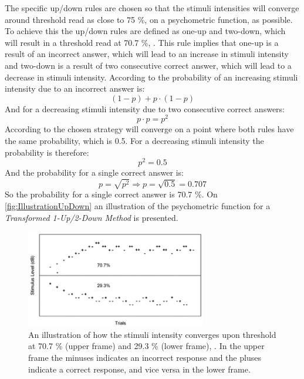The specific up/down rules are chosen so that the stimuli intensities will converge around threshold read as close to 75 \%, on a psychometric function, as possible. To achieve this the up/down rules are defined as one-up and two-down, which will result in a threshold read at 70.7 \%, \parencite[p. 22]{PDF:Psychoacoustic}. This rule implies that one-up is a result of an incorrect answer, which will lead to an increase in stimuli intensity and two-down is a result of two consecutive correct answer, which will lead to a decrease in stimuli intensity. According to \textcite[p. 293]{PDF:Hearing} the probability of an increasing stimuli intensity due to an incorrect answer is: 
%
\begin{equation}
	(1-p)+p\cdot(1-p)
\end{equation}  
%
And for a decreasing stimuli intensity due to two consecutive correct answers: 
%
\begin{equation}
	p\cdot p = p^2
\end{equation}    
%       
According to \textcite[p. 293]{PDF:Hearing} the chosen strategy will converge on a point where both rules have the same probability, which is 0.5. For a decreasing stimuli intensity the probability is therefore:
%
\begin{equation}
	p^2=0.5
\end{equation}  
%
And the probability for a single correct answer is: 
%
\begin{equation}
	p = \sqrt{p^2} \Rightarrow p = \sqrt{0.5} = 0.707
\end{equation}
%
So the probability for a single correct answer is 70.7 \%. On \autoref{fig:IllustrationUpDown} an illustration of the psychometric function for a \textit{Transformed 1-Up/2-Down Method} is presented. 
%
\begin{figure}[H]
	\centering
	\includegraphics[resolution=300,width=0.7\textwidth]{Figure/IllustrationOfUpDown}
	\caption{An illustration of how the stimuli intensity converges upon threshold at 70.7 \% (upper frame) and 29.3 \% (lower frame), \parencite[p. 294]{PDF:Hearing}. In the upper frame the minuses indicates an incorrect response and the pluses indicate a correct response, and vice versa in the lower frame.}
	\label{fig:IllustrationUpDown}
\end{figure}
